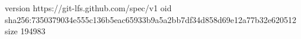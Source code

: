 version https://git-lfs.github.com/spec/v1
oid sha256:7350379034e555c136b5eac65933b9a5a2bb7df34d858d69e12a77b32e620512
size 194983
